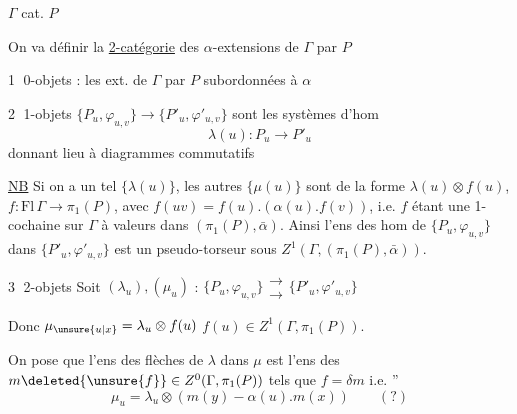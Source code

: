 $\Gamma$ cat. \quad $P$ 

On va définir la \uline{2-catégorie} des $\alpha$-extensions
de $\Gamma$ par $P$

\textcircled{1} 0-objets : les ext. de $\Gamma$ par $P$ subordonnées à $\alpha$

\textcircled{2} 1-objets \quad $\{P_u,\varphi_{u,v}\}\longrightarrow\{P'_u,\varphi'_{u,v}\}$
sont les systèmes d'hom
\[
\lambda(u):P_u\to P'_u
\]
donnant lieu à diagrammes commutatifs

\uline{NB} Si on a un tel $\{\lambda(u)\}$, les
autres  $\{\mu(u)\}$ sont de
la forme $\lambda(u)\otimes f(u)$, $f:\mathrm{Fl}\,\Gamma\to\pi_1(P)$,
avec $f(uv)=f(u).(\alpha(u).f(v))$, i.e. $f$ étant
une 1-cochaine sur $\Gamma$ à valeurs dans
$(\pi_1(P),\bar\alpha)$. Ainsi l'ens des hom
de $\{P_u,\varphi_{u,v}\}$ dans $\bigl\{P'_u,\varphi'_{u,v}\bigr\}$ est un
 pseudo-torseur sous $Z^1(\Gamma,(\pi_1(P),\bar\alpha))$.

\textcircled{3} 2-objets \quad Soit $(\lambda_u),(\mu_u)$ \deleted{$\unsure{\leftrightarrow|\to}$} :
$\{P_u,\varphi_{u,v}\}\mathrel{\substack{\longrightarrow\\[-4pt]\longrightarrow}}\{P'_u,\varphi'_{u,v}\}$

Donc $\mu_{\unsure{u|x}}=\lambda_u\otimes f(u)$ \quad $f(u)\in Z^1(\Gamma,\pi_1(P))$.

On pose que l'ens des flèches de
 $\lambda$ dans $\mu$ est l'ens des $m\deleted{\unsure{f}}\in Z^0(\Gamma,\pi_1(P))$
tels que $f=\delta m$ i.e.
\hfill\textquotedblright
\[
\mu_u=\lambda_u\otimes(m(y)-\alpha(u).m(x))\qquad(?)
\]
